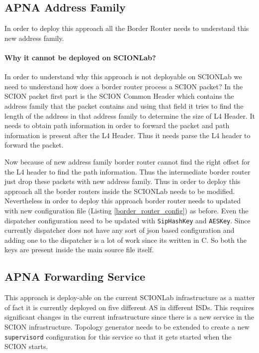 \begin{code}
\inputminted[frame=lines, framesep=2mm, baselinestretch=1.2, fontsize=\footnotesize, breaklines]{json}{code_snippets/border_router.json} \label{border_router_config}
\end{code}

\subsection{APNA Address Family}
In order to deploy this approach all the Border Router needs to understand this new address family. 

\paragraph{Why it cannot be deployed on SCIONLab?}
In order to understand why this approach is not deployable on SCIONLab we need to understand how does a border router process a SCION packet? In the SCION packet first part is the SCION Common Header which contains the address family that the packet contains and using that field it tries to find the length of the address in that address family to determine the size of L4 Header. It needs to obtain path information in order to forward the packet and path information is present after the L4 Header. Thus it needs parse the L4 header to forward the packet.

Now because of new address family border router cannot find the right offset for the L4 header to find the path information. Thus the intermediate border router just drop these packets with new address family. Thus in order to deploy this approach all the border routers inside the SCIONLab needs to be modified.
\newline \newline
Nevertheless in order to deploy this approach border router needs to updated with new configuration file (Listing \ref{border_router_config}) as before. Even the dispatcher configuration need to be updated with \texttt{SipHashKey} and \texttt{AESKey}. Since currently dispatcher does not have any sort of json based configuration and adding one to the dispatcher is a lot of work since its written in C. So both the keys are present inside the main source file itself.

\subsection{APNA Forwarding Service}
This approach is deploy-able on the current SCIONLab infrastructure as a matter of fact it is currently deployed on five different AS in different ISDs. This requires significant changes in the current infrastructure since there is a new service in the SCION infrastructure. Topology generator needs to be extended to create a new \texttt{supervisord} configuration for this service so that it gets started when the SCION starts.

